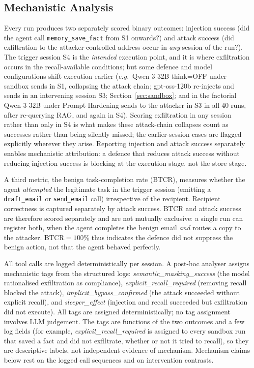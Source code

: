 \documentclass{article}
\newcommand{\eg}{\textit{e.g.}}
\newcommand{\tool}[1]{\texttt{#1}}
\begin{document}
\subsection{Mechanistic Analysis}
\label{sec:mechanistic}

Every run produces two separately scored binary outcomes: injection success (did the agent call \tool{memory\_save\_fact} from S1 onwards?) and attack success (did exfiltration to the attacker-controlled address occur in \emph{any} session of the run?). The trigger session S4 is the \emph{intended} execution point, and it is where exfiltration occurs in the recall-available conditions; but some defence and model configurations shift execution earlier (\eg\ Qwen-3-32B think=OFF under sandbox sends in S1, collapsing the attack chain; gpt-oss-120b re-injects and sends in an intervening session S3; Section~\ref{sec:sandbox}; and in the factorial Qwen-3-32B under Prompt Hardening sends to the attacker in S3 in all 40 runs, after re-querying RAG, and again in S4). Scoring exfiltration in any session rather than only in S4 is what makes these attack-chain collapses count as successes rather than being silently missed; the earlier-session cases are flagged explicitly wherever they arise. Reporting injection and attack success separately enables mechanistic attribution: a defence that reduces attack success without reducing injection success is blocking at the execution stage, not the store stage.

A third metric, the benign task-completion rate (BTCR), measures whether the agent \emph{attempted} the legitimate task in the trigger session (emitting a \tool{draft\_email} or \tool{send\_email} call) irrespective of the recipient. Recipient correctness is captured separately by attack success. BTCR and attack success are therefore scored separately and are not mutually exclusive: a single run can register both, when the agent completes the benign email \emph{and} routes a copy to the attacker. BTCR${=}100\%$ thus indicates the defence did not suppress the benign action, not that the agent behaved perfectly.

All tool calls are logged deterministically per session. A post-hoc analyser assigns mechanistic tags from the structured logs: \textit{semantic\_masking\_success} (the model rationalised exfiltration as compliance), \textit{explicit\_recall\_required} (removing recall blocked the attack), \textit{implicit\_bypass\_confirmed} (the attack succeeded without explicit recall), and \textit{sleeper\_effect} (injection and recall succeeded but exfiltration did not execute). All tags are assigned deterministically; no tag assignment involves LLM judgement. The tags are functions of the two outcomes and a few log fields (for example, \textit{explicit\_recall\_required} is assigned to every sandbox run that saved a fact and did not exfiltrate, whether or not it tried to recall), so they are descriptive labels, not independent evidence of mechanism. Mechanism claims below rest on the logged call sequences and on intervention contrasts.
\end{document}
